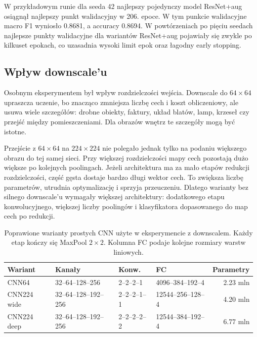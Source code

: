 \documentclass[12pt,a4paper]{article}
\begin{document}
W przykładowym runie dla seeda 42 najlepszy pojedynczy model ResNet+aug osiągnął najlepszy punkt walidacyjny w 206. epoce. W tym punkcie walidacyjne macro F1 wyniosło 0.8681, a accuracy 0.8694. W powtórzeniach po pięciu seedach najlepsze punkty walidacyjne dla wariantów ResNet+aug pojawiały się zwykle po kilkuset epokach, co uzasadnia wysoki limit epok oraz łagodny early stopping.

\subsection{Wpływ downscale'u}

Osobnym eksperymentem był wpływ rozdzielczości wejścia. Downscale do \(64 \times 64\) upraszcza uczenie, bo znacząco zmniejsza liczbę cech i koszt obliczeniowy, ale usuwa wiele szczegółów: drobne obiekty, faktury, układ blatów, lamp, krzeseł czy przejść między pomieszczeniami. Dla obrazów wnętrz te szczegóły mogą być istotne.

Przejście z \(64 \times 64\) na \(224 \times 224\) nie polegało jednak tylko na podaniu większego obrazu do tej samej sieci. Przy większej rozdzielczości mapy cech pozostają dużo większe po kolejnych poolingach. Jeżeli architektura ma za mało etapów redukcji rozdzielczości, część gęsta dostaje bardzo długi wektor cech. To zwiększa liczbę parametrów, utrudnia optymalizację i sprzyja przeuczeniu. Dlatego warianty bez silnego downscale'u wymagały większej architektury: dodatkowego etapu konwolucyjnego, większej liczby poolingów i klasyfikatora dopasowanego do map cech po redukcji.

\begin{table}[H]
\centering
\caption{Poprawione warianty prostych CNN użyte w eksperymencie z downscalem. Każdy etap kończy się MaxPool \(2 \times 2\). Kolumna FC podaje kolejne rozmiary warstw liniowych.}
\label{tab:simple_cnn_arch}
\small
\begin{tabular}{@{}llllr@{}}
\toprule
Wariant & Kanały & Konw. & FC & Parametry \\
\midrule
CNN64 & 32--64--128--256 & 2--2--2--1 & 4096--384--192--4 & 2.23 mln \\
CNN224 wide & 32--64--128--192--256 & 2--2--2--1--1 & 12544--256--128--4 & 4.20 mln \\
CNN224 deep & 32--64--128--192--256 & 2--2--2--2--2 & 12544--384--192--4 & 6.77 mln \\
\bottomrule
\end{tabular}
\end{table}
\end{document}
